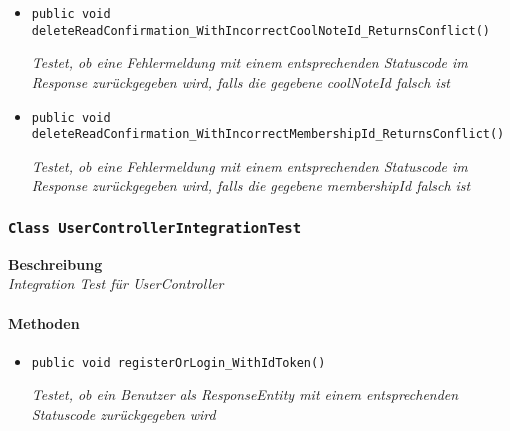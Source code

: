 \begin{itemize}
 	\item{\texttt{public void deleteReadConfirmation\_WithIncorrectCoolNoteId\_Returns\-Conflict()}}
 	
 	\textit{Testet, ob eine Fehlermeldung mit einem entsprechenden Statuscode im Response zurückgegeben wird, falls die gegebene coolNoteId falsch ist}
 	
 	\item{\texttt{public void deleteReadConfirmation\_WithIncorrectMembershipId\_Returns\-Conflict()}}
 	
 	\textit{Testet, ob eine Fehlermeldung mit einem entsprechenden Statuscode im Response zurückgegeben wird, falls die gegebene membershipId falsch ist} 	
 \end{itemize}
 
 \subsubsection{\texttt{Class UserControllerIntegrationTest}}
 \textbf{Beschreibung} \\
 \textit{Integration Test für UserController}
 \paragraph*{Methoden}
 \begin{itemize}
 	\item{\texttt{public void registerOrLogin\_WithIdToken()}}
 	
 	\textit{Testet, ob ein Benutzer als ResponseEntity mit einem entsprechenden Statuscode zurückgegeben wird}
 \end{itemize}